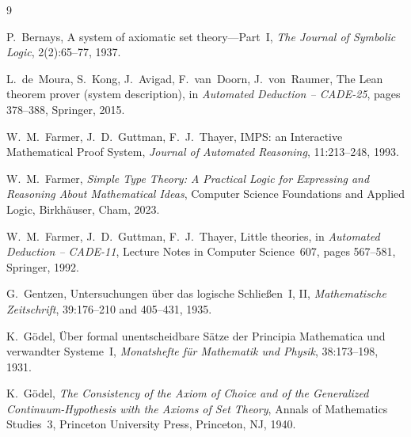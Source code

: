\documentclass{amsbook}[openany]
\theoremstyle{definition}
\theoremstyle{remark}
\theoremstyle{remark}
\renewcommand{\[}{\par\smallskip\begin{lrbox}{\VNBdispbox}$\displaystyle}
\renewcommand{\]}{$\end{lrbox}%
    \noindent
    \ifdim\wd\VNBdispbox>\linewidth
      \resizebox{\linewidth}{!}{\usebox{\VNBdispbox}}%
    \else
      \hbox to \linewidth{\hfil\usebox{\VNBdispbox}\hfil}%
    \fi
    \par\smallskip}
\begin{document}
\begin{thebibliography}{9}

P.~Bernays,
A system of axiomatic set theory---Part~I,
\textit{The Journal of Symbolic Logic}, 2(2):65--77, 1937.

L.~de~Moura, S.~Kong, J.~Avigad, F.~van~Doorn, J.~von~Raumer,
The Lean theorem prover (system description),
in \textit{Automated Deduction -- CADE-25}, pages 378--388, Springer, 2015.

W.~M.~Farmer, J.~D.~Guttman, F.~J.~Thayer,
IMPS: an Interactive Mathematical Proof System,
\textit{Journal of Automated Reasoning}, 11:213--248, 1993.

W.~M.~Farmer,
\textit{Simple Type Theory: A Practical Logic for Expressing and Reasoning
About Mathematical Ideas},
Computer Science Foundations and Applied Logic, Birkh\"auser, Cham, 2023.

W.~M.~Farmer, J.~D.~Guttman, F.~J.~Thayer,
Little theories,
in \textit{Automated Deduction -- CADE-11}, Lecture Notes in Computer
Science~607, pages 567--581, Springer, 1992.

G.~Gentzen,
Untersuchungen \"uber das logische Schlie\ss en~I, II,
\textit{Mathematische Zeitschrift}, 39:176--210 and 405--431, 1935.

K.~G\"odel,
\"Uber formal unentscheidbare S\"atze der Principia Mathematica und
verwandter Systeme~I,
\textit{Monatshefte f\"ur Mathematik und Physik}, 38:173--198, 1931.

K.~G\"odel,
\textit{The Consistency of the Axiom of Choice and of the Generalized
Continuum-Hypothesis with the Axioms of Set Theory},
Annals of Mathematics Studies~3, Princeton University Press, Princeton, NJ, 1940.


\end{thebibliography}
\end{document}
